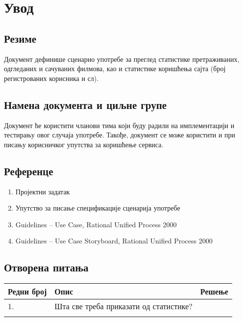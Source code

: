\section{Увод}

\subsection{Резиме}

Документ дефинише сценарио употребе за преглед статистике претраживаних, одгледаних и сачуваних
филмова, као и статистике коришћења сајта (број регистрованих корисника и сл).

\subsection{Намена документа и циљне групе}

Документ ће користити чланови тима који буду радили на имплементацији и тестирању овог случаја
употребе. Такође, документ се може користити и при писању корисничког упутства за коришћење
сервиса.

\subsection{Референце}

\begin{enumerate}
    \item Пројектни задатак
    \item Упутство за писање спецификације сценарија употребе
    \item Guidelines – Use Case, Rational Unified Process 2000
    \item Guidelines – Use Case Storyboard, Rational Unified Process 2000
\end{enumerate}

\subsection{Отворена питања}

\noindent
\setcellgapes{4pt}
\makegapedcells
\begin{tabularx}{\linewidth}{|l|X|X|}
    \hline
    \textbf{Редни број} & \textbf{Опис} & \textbf{Решење} \\
    \hline
    1. & Шта све треба приказати од статистике? & \\
    \hline
    & & \\
    \hline
\end{tabularx}

